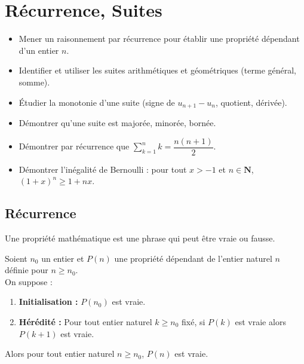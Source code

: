 \documentclass[11pt,a4paper,openany]{book}
\theoremstyle{definition}
\begin{document}
    \newpage

    \chapter{Récurrence, Suites}

    \begin{capacitesbox}
    \begin{itemize}
        \item Mener un raisonnement par récurrence pour établir une propriété dépendant d'un entier $n$.
        \item Identifier et utiliser les suites arithmétiques et géométriques (terme général, somme).
        \item Étudier la monotonie d'une suite (signe de $u_{n+1}-u_n$, quotient, dérivée).
        \item Démontrer qu'une suite est majorée, minorée, bornée.
    \end{itemize}
    \end{capacitesbox}

    \begin{demoprogbox}
    \begin{itemize}
        \item Démontrer par récurrence que $\displaystyle\sum_{k=1}^{n}k=\dfrac{n(n+1)}{2}$.
        \item Démontrer l'inégalité de Bernoulli : pour tout $x>-1$ et $n\in\mathbf{N}$,
              $(1+x)^n\geq 1+nx$.
    \end{itemize}
    \end{demoprogbox}

    \section{Récurrence}
    \begin{Définition}
        Une propriété mathématique est une phrase qui peut être vraie ou fausse.
    \end{Définition}

    \begin{Théorème}
        Soient $n_0$ un entier et $P(n)$ une propriété dépendant de l'entier naturel $n$
        définie pour $n\geq n_0$.\\
        On suppose :
        \begin{enumerate}
            \item \textbf{Initialisation :} $P(n_0)$ est vraie.
            \item \textbf{Hérédité :} Pour tout entier naturel $k\geq n_0$ fixé, si $P(k)$
                  est vraie alors $P(k+1)$ est vraie.
        \end{enumerate}
        Alors pour tout entier naturel $n\geq n_0$, $P(n)$ est vraie.
    \end{Théorème}
\end{document}
